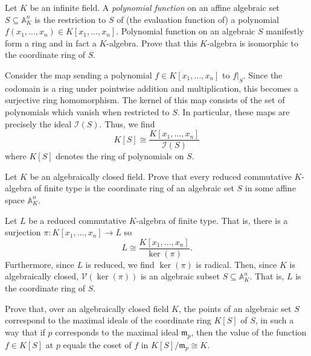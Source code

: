 \documentclass[../../master.tex]{subfiles}
\begin{document}
\begin{problem}
    Let $K$ be an infinite field.
    A \textit{polynomial function} on an affine algebraic set $S \subseteq \mathbb{A}^{n}_K$ is the restriction to $S$ of (the evaluation function of) a polynomial $f(x_1, \ldots, x_n) \in K[x_1, \ldots, x_n]$.
    Polynomial function on an algebraic $S$ manifestly form a ring and in fact a $K$-algebra.
    Prove that this $K$-algebra is isomorphic to the coordinate ring of $S$.
\end{problem}

\begin{solution}
    Consider the map sending a polynomial $f \in K[x_1, \ldots, x_n]$ to $f |_S$.
    Since the codomain is a ring under pointwise addition and multiplication, this becomes a surjective ring homomorphism.
    The kernel of this map consists of the set of polynomials which vanish when restricted to $S$.
    In particular, these maps are precisely the ideal $\mathscr{I}(S)$.
    Thus, we find
    \[
        K[S] \cong \frac{K[x_1, \ldots, x_n]}{\mathscr{I}(S)}
    \]
    where $K[S]$ denotes the ring of polynomials on $S$.
\end{solution}

\begin{problem}
    Let $K$ be an algebraically closed field.
    Prove that every reduced commutative $K$-algebra of finite type is the coordinate ring of an algebraic set $S$ in some affine space $\mathbb{A}^{n}_K$.
\end{problem}

\begin{solution}
    Let $L$ be a reduced commutative $K$-algebra of finite type.
    That is, there is a surjection $\pi : K[x_1, \ldots, x_n] \to L$ so
    \[
        L \cong \frac{K[x_1, \ldots, x_n]}{\ker(\pi)}.
    \]
    Furthermore, since $L$ is reduced, we find $\ker(\pi)$ is radical.
    Then, since $K$ is algebraically closed, $\mathscr{V}(\ker(\pi))$ is an algebraic subset $S \subseteq \mathbb{A}^{n}_K$.
    That is, $L$ is the coordinate ring of $S$.
\end{solution}

\begin{problem}
    Prove that, over an algebraically closed field $K$, the points of an algebraic set $S$ correspond to the maximal ideals of the coordinate ring $K[S]$ of $S$, in such a way that if $p$ corresponds to the maximal ideal $\mathfrak{m}_p$, then the value of the function $f \in K[S]$ at $p$ equals the coset of $f$ in $K[S] / \mathfrak{m}_p \cong K$.
\end{problem}
\end{document}
